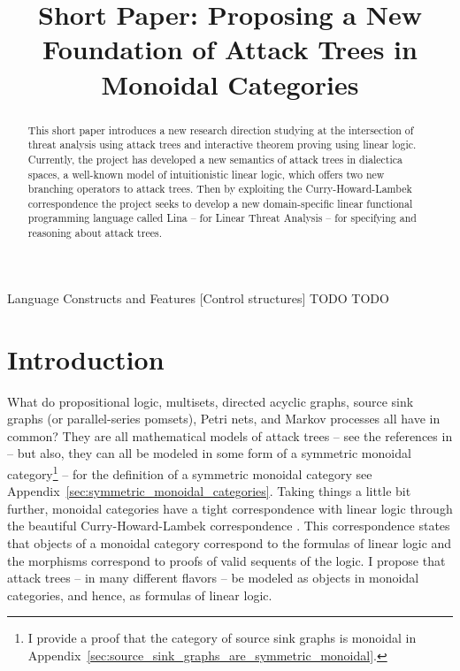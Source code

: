 \documentclass{sigplanconf}
\date{}
\begin{document}
\copyrightdata{}
\copyrightdoi{}
\titlebanner{}

\title{Short Paper: Proposing a New Foundation of Attack Trees in Monoidal Categories}


\maketitle 

\begin{abstract}
  This short paper introduces a new research direction studying at the
  intersection of threat analysis using attack trees and interactive
  theorem proving using linear logic.  Currently, the project has
  developed a new semantics of attack trees in dialectica spaces, a
  well-known model of intuitionistic linear logic, which offers two
  new branching operators to attack trees.  Then by exploiting the
  Curry-Howard-Lambek correspondence the project seeks to develop a
  new domain-specific linear functional programming language called
  Lina -- for Linear Threat Analysis -- for specifying and reasoning
  about attack trees.
\end{abstract}

{Language Constructs and Features}
[Control structures]
\terms
TODO
\keywords
TODO

\section{Introduction}
\label{sec:introduction}

What do propositional logic, multisets, directed acyclic graphs,
source sink graphs (or parallel-series pomsets), Petri nets, and
Markov processes all have in common?  They are all mathematical models
of attack trees -- see the references in
\cite{Kordy:2014a,Jhawar:2015} -- but also, they can all be modeled in
some form of a symmetric monoidal category\footnote{I provide a proof
  that the category of source sink graphs is monoidal in
  Appendix~\ref{sec:source_sink_graphs_are_symmetric_monoidal}.}
\cite{Tzouvaras:1998,Brown:1991,Fiore:2013,FrancescoAlbasini2010} --
for the definition of a symmetric monoidal category see
Appendix~\ref{sec:symmetric_monoidal_categories}.  Taking things a
little bit further, monoidal categories have a tight correspondence
with linear logic through the beautiful Curry-Howard-Lambek
correspondence \cite{MSC:4439568}.  This correspondence states that
objects of a monoidal category correspond to the formulas of linear
logic and the morphisms correspond to proofs of valid sequents of the
logic.  I propose that attack trees -- in many different flavors -- be
modeled as objects in monoidal categories, and hence, as formulas of
linear logic.
\end{document}
